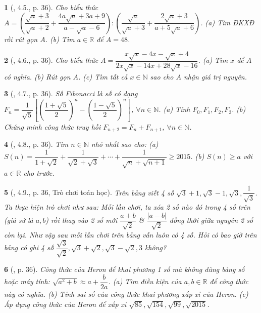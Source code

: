 \documentclass{article}
\newtheorem{baitoan}{}
\begin{document}
\begin{baitoan}[\cite{Binh_boi_duong_Toan_9_tap_1}, 4.5., p. 36]
	Cho biểu thức $A = \left(\dfrac{\sqrt{a} + 3}{\sqrt{a} + 2} + \dfrac{4a\sqrt{a} + 3a + 9}{a - \sqrt{a} - 6}\right):\left(\dfrac{\sqrt{a}}{\sqrt{a} + 3} + \dfrac{2\sqrt{a} + 3}{a + 5\sqrt{a} + 6}\right)$. (a) Tìm {\rm ĐKXĐ} rồi rút gọn $A$. (b) Tìm $a\in\mathbb{R}$ để $A = 48$.
\end{baitoan}

\begin{baitoan}[\cite{Binh_boi_duong_Toan_9_tap_1}, 4.6., p. 36]
	Cho biểu thức $A = \dfrac{x\sqrt{x} - 4x - \sqrt{x} + 4}{2x\sqrt{x} - 14x + 28\sqrt{x} - 16}$. (a) Tìm $x$ để $A$ có nghĩa. (b) Rút gọn $A$. (c) Tìm tất cả $x\in\mathbb{N}$ sao cho $A$ nhận giá trị nguyên.
\end{baitoan}

\begin{baitoan}[\cite{Binh_boi_duong_Toan_9_tap_1}, 4.7., p. 36]
	Số Fibonacci là số có dạng $F_n = \dfrac{1}{\sqrt{5}}\left[\left(\dfrac{1 + \sqrt{5}}{2}\right)^n - \left(\dfrac{1 - \sqrt{5}}{2}\right)^n\right]$, $\forall n\in\mathbb{N}$. (a) Tính $F_0,F_1,F_2,F_3$. (b) Chứng minh công thức truy hồi $F_{n + 2} = F_n + F_{n + 1}$, $\forall n\in\mathbb{N}$.
\end{baitoan}

\begin{baitoan}[\cite{Binh_boi_duong_Toan_9_tap_1}, 4.8., p. 36]
	Tìm $n\in\mathbb{N}$ nhỏ nhất sao cho: (a) $S(n) = \dfrac{1}{1 + \sqrt{2}} + \dfrac{1}{\sqrt{2} + \sqrt{3}} + \cdots + \dfrac{1}{\sqrt{n} + \sqrt{n + 1}}\ge2015$. (b) $S(n)\ge a$ với $a\in\mathbb{R}$ cho trước.
\end{baitoan}

\begin{baitoan}[\cite{Binh_boi_duong_Toan_9_tap_1}, 4.9., p. 36, Trò chơi toán học]
	Trên bảng viết 4 số $\sqrt{3} + 1,\sqrt{3} - 1,\sqrt{3},\dfrac{1}{\sqrt{3}}$. Ta thực hiện trò chơi như sau: Mỗi lần chơi, ta xóa 2 số nào đó trong 4 số trên (giả sử là $a,b$) rồi thay vào 2 số mới $\dfrac{a + b}{\sqrt{2}}$ \& $\dfrac{|a - b|}{\sqrt{2}}$ đồng thời giữa nguyên 2 số còn lại. Như vậy sau mỗi lần chơi trên bảng vẫn luôn có 4 số. Hỏi có bao giờ trên bảng có ghi 4 số $\dfrac{\sqrt{3}}{\sqrt{2}},\sqrt{3} + \sqrt{2},\sqrt{3} - \sqrt{2},3$ không?
\end{baitoan}

\begin{baitoan}[\cite{Binh_boi_duong_Toan_9_tap_1}, p. 36]
	Công thức của Heron để khai phương 1 số mà không dùng bảng số hoặc máy tính: $\sqrt{a^2 + b}\approx a + \dfrac{b}{2a}$. (a) Tìm điều kiện của $a,b\in\mathbb{R}$ để công thức này có nghĩa. (b) Tính sai số của công thức khai phương xấp xỉ của Heron. (c) Áp dụng công thức của Heron để xấp xỉ $\sqrt{85},\sqrt{154},\sqrt{99},\sqrt{2015}$.
\end{baitoan}
\end{document}
